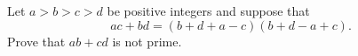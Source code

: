 Let $a > b > c > d$ be positive integers and suppose that \[ ac + bd = (b+d+a-c)(b+d-a+c).  \] Prove that $ab + cd$ is not prime.